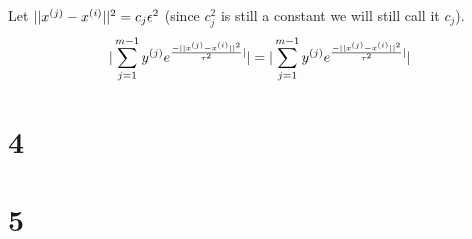 \documentclass[11pt]{article}
\begin{document}
Let $||x^{(j)} - x^{(i)}||^2 = c_j \epsilon^2$ (since $c_j^2$ is still a constant we will still call it $c_j$).
\begin{align*}
    |\sum_{j=1}^{m-1} y^{(j)} e^{\frac{-||x^{(j)} - x^{(i)}||^2}{\tau^2}|}| 
     &= |\sum_{j=1}^{m-1} y^{(j)} e^{\frac{-||x^{(j)} - x^{(i)}||^2}{\tau^2}|}| \\
\end{align*}
\section*{4}

\section*{5}
\end{document}
